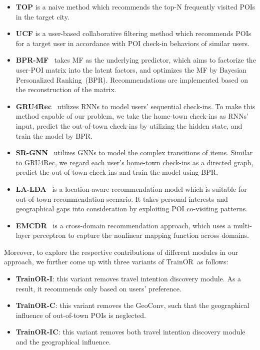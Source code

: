 \documentclass[letterpaper]{article} %
\newcommand{\ourmodel}{{\sc TrainOR}}
\begin{document}
\begin{itemize}
  \item
  \textbf{TOP} is a naive method which recommends the top-N frequently visited POIs in the target city.
  \item
  \textbf{UCF} is a user-based collaborative filtering method which recommends POIs for a target user in accordance with POI check-in behaviors of similar users.
  \item
  \textbf{BPR-MF}~\cite{rendle2012bpr} takes MF as the underlying predictor, which aims to factorize the user-POI matrix into the latent factors, and optimizes the MF by Bayesian Personalized Ranking~(BPR).
  Recommendations are implemented based on the reconstruction of the matrix.
  \item
  \textbf{GRU4Rec}~\cite{hidasi2015session} utilizes RNNs to model users' sequential check-ins.
  To make this method capable of our problem, we take the home-town check-ins as RNNs' input, predict the out-of-town check-ins by utilizing the hidden state, and train the model by BPR.
  \item
  \textbf{SR-GNN}~\cite{wu2019session} utilizes GNNs to model the complex transitions of items.
  Similar to GRU4Rec, we regard each user's home-town check-ins as a directed graph, predict the out-of-town check-ins and train the model using BPR.
  \item
  \textbf{LA-LDA}~\cite{yin2014lcars} is a location-aware recommendation model which is suitable for out-of-town recommendation scenario.
  It takes personal interests and geographical gaps into consideration by exploiting POI co-visiting patterns.
  \item
  \textbf{EMCDR}~\cite{man2017cross} is a cross-domain recommendation approach, which uses a multi-layer perceptron to capture the nonlinear mapping function across domains.
\end{itemize}

Moreover, to explore the respective contributions of different modules in our approach, we further come up with three variants of \ourmodel~as follows:

\begin{itemize}
    \item
    \textbf{\ourmodel-I}: this variant removes travel intention discovery module.
    As a result, it recommends only based on users' preference.
    \item
    \textbf{\ourmodel-C}: this variant removes the GeoConv, such that the geographical influence of out-of-town POIs is neglected.
    \item
    \textbf{\ourmodel-IC}: this variant removes both travel intention discovery module and the geographical influence.
\end{itemize}
\end{document}
